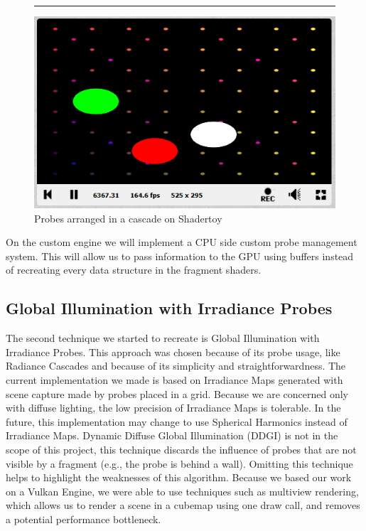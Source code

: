 \documentclass{rapportCS}
\begin{document}
\begin{figure}
\centering
\rule{1cm}{1cm}
\includegraphics{figures/shadertoy/shadertoy_cascades.png}
\caption{Probes arranged in a cascade on Shadertoy}
\end{figure}

On the custom engine we will implement a CPU side custom probe management system. This will allow us to pass information to the GPU using buffers instead of recreating every data structure in the fragment shaders.


\subsection{Global Illumination with Irradiance Probes}
The second technique we started to recreate is Global Illumination with Irradiance Probes. This approach was chosen because of its probe usage, like Radiance Cascades and because of its simplicity and straightforwardness.
The current implementation we made is based on Irradiance Maps generated with scene capture made by probes placed in a grid. Because we are concerned only with diffuse lighting, the low precision of Irradiance Maps is tolerable. In the future, this implementation may change to use Spherical Harmonics instead of Irradiance Maps.
Dynamic Diffuse Global Illumination (DDGI) is not in the scope of this project, this technique discards the influence of probes that are not visible by a fragment (e.g., the probe is behind a wall). Omitting this technique helps to highlight the weaknesses of this algorithm.
Because we based our work on a Vulkan Engine, we were able to use techniques such as multiview rendering, which allows us to render a scene in a cubemap using one draw call, and removes a potential performance bottleneck.
\end{document}
